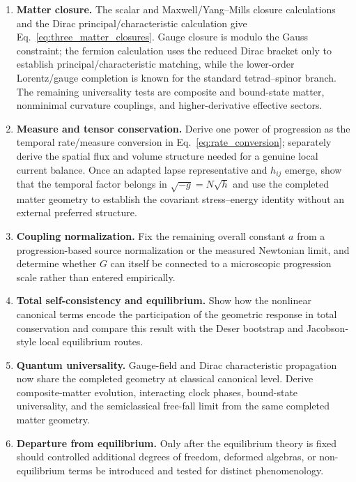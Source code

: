 \documentclass[11pt]{article}
\begin{document}
\begin{enumerate}[label=\textbf{Step \arabic*:},leftmargin=1.05in]
    \item \textbf{Matter closure.} The scalar and Maxwell/Yang--Mills closure calculations and the Dirac principal/characteristic calculation give Eq.~\eqref{eq:three_matter_closures}. Gauge closure is modulo the Gauss constraint; the fermion calculation uses the reduced Dirac bracket only to establish principal/characteristic matching, while the lower-order Lorentz/gauge completion is known for the standard tetrad--spinor branch. The remaining universality tests are composite and bound-state matter, nonminimal curvature couplings, and higher-derivative effective sectors.

    \item \textbf{Measure and tensor conservation.} Derive one power of progression as the temporal rate/measure conversion in Eq.~\eqref{eq:rate_conversion}; separately derive the spatial flux and volume structure needed for a genuine local current balance. Once an adapted lapse representative and $h_{ij}$ emerge, show that the temporal factor belongs in $\sqrt{-g}=N\sqrt h$ and use the completed matter geometry to establish the covariant stress--energy identity without an external preferred structure.

    \item \textbf{Coupling normalization.} Fix the remaining overall constant $a$ from a progression-based source normalization or the measured Newtonian limit, and determine whether $G$ can itself be connected to a microscopic progression scale rather than entered empirically.

    \item \textbf{Total self-consistency and equilibrium.} Show how the nonlinear canonical terms encode the participation of the geometric response in total conservation and compare this result with the Deser bootstrap and Jacobson-style local equilibrium routes.

    \item \textbf{Quantum universality.} Gauge-field and Dirac characteristic propagation now share the completed geometry at classical canonical level. Derive composite-matter evolution, interacting clock phases, bound-state universality, and the semiclassical free-fall limit from the same completed matter geometry.

    \item \textbf{Departure from equilibrium.} Only after the equilibrium theory is fixed should controlled additional degrees of freedom, deformed algebras, or non-equilibrium terms be introduced and tested for distinct phenomenology.
\end{enumerate}
\end{document}
